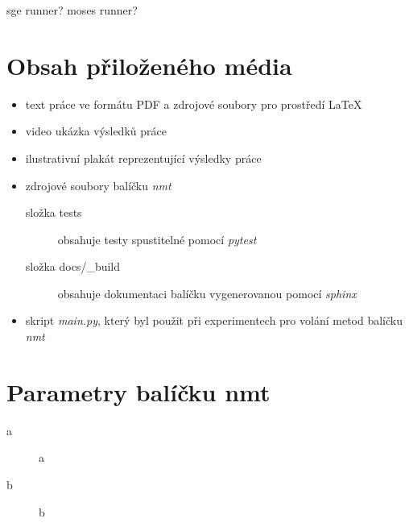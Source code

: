 

sge runner? moses runner?

\chapter{Obsah přiloženého média}
\begin{itemize}
  \item text práce ve formátu PDF a zdrojové soubory pro prostředí \LaTeX
  \item video ukázka výsledků práce
  \item ilustrativní plakát reprezentující výsledky práce
  \item zdrojové soubory balíčku \emph{nmt}
    \begin{description}
      \item[složka tests] obsahuje testy spustitelné pomocí \emph{pytest}
      \item[složka docs/\_build] obsahuje dokumentaci balíčku vygenerovanou pomocí \emph{sphinx}
    \end{description}
  \item skript \emph{main.py}, který byl použit při experimentech pro volání metod balíčku \emph{nmt}
\end{itemize}

\chapter{Parametry balíčku nmt} 
\begin{description}
  \item[a] a
  \item[b] b
\end{description}